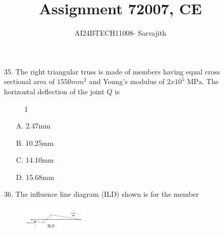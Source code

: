 \documentclass[journal]{IEEEtran}
\begin{document}

\vspace{3cm}


\author{AI24BTECH11008- Sarvajith
}
\title{Assignment 7}
{\let\newpage\relax\maketitle}
\title{2007, CE}
\renewcommand{\thefigure}{\theenumi}
\renewcommand{\thetable}{\theenumi}
\setlength{\intextsep}{10pt} %
\renewcommand{\thetable}{\theenumi}
\begin{enumerate}
  \item[35.]The right triangular truss is made of members having equal cross sectional area of
  $1550 mm^2$ and Young's modulus of $2 x 10^5$ MPa. The horizontal deflection of the
  joint $Q$ is 
  \begin{figure}[!ht]
    \centering
    \caption{ 1}
    \label{fig:triangle_diagram}
\end{figure}
  \begin{enumerate}
    \item [A.] 2.47mm
    \item [B.] 10.25mm
    \item [C.] 14.10mm
    \item [D.] 15.68mm
  \end{enumerate}
  \item[36.] The influence line diagram (ILD) shown is for the member
  \begin{figure}[h!]
    \centering
    \includegraphics[width=0.3\textwidth]{figs/image.png}  %
    
    \label{fig:sample2}
\end{figure}
 \begin{figure}[h!]
 \centering
 
 \label{fig:sample1}
 \end{figure}
    

\end{enumerate}
\end{document}
